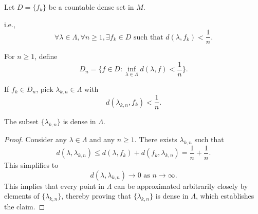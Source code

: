 \documentclass[UTF8,a4paper,10pt]{article}
\begin{document}









Let \( D = \{f_k\} \) be a countable dense set in \( M \).

i.e., 
\[
\forall \lambda \in \Lambda, \forall n \geq 1, \exists f_k \in D \text{ such that } d(\lambda, f_k) < \frac{1}{n}.
\]

For \( n \geq 1 \), define 
\[
D_n = \{ f \in D : \inf_{\lambda \in \Lambda} d(\lambda, f) < \frac{1}{n} \}.
\]

If \( f_k \in D_n \), pick \( \lambda_{k,n} \in \Lambda \) with 
\[
d(\lambda_{k,n}, f_k) < \frac{1}{n}.
\]

\begin{claim}[]{}
The subset \( \{\lambda_{k,n}\} \) is dense in \( \Lambda \).
\end{claim}

\begin{proof}
Consider any \( \lambda \in \Lambda \) and any \( n \geq 1 \). There exists \( \lambda_{k,n} \) such that
\[
d(\lambda, \lambda_{k,n}) \leq d(\lambda, f_k) + d(f_k, \lambda_{k,n}) = \frac{1}{n} + \frac{1}{n}.
\]
This simplifies to 
\[
d(\lambda, \lambda_{k,n}) \to 0 \text{ as } n \to \infty.
\]
This implies that every point in \( \Lambda \) can be approximated arbitrarily closely by elements of \( \{\lambda_{k,n}\} \), thereby proving that \( \{\lambda_{k,n}\} \) is dense in \( \Lambda \), which establishes the claim.
\end{proof}
\end{document}
